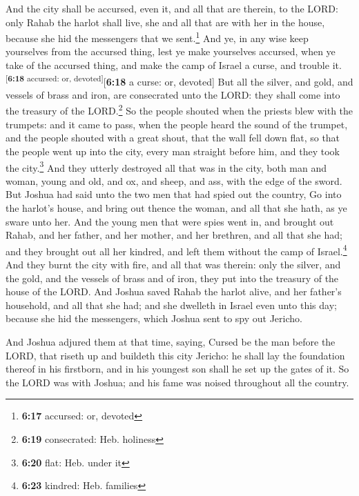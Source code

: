 And the city shall be accursed, even it, and all that
are therein, to the LORD: only Rahab the harlot shall live, she and all
that are with her in the house, because she hid the messengers that we
sent.\footnote{\textbf{6:17} accursed: or, devoted}  And
ye, in any wise keep yourselves from the accursed thing, lest ye make
yourselves accursed, when ye take of the accursed thing, and make the
camp of Israel a curse, and trouble it.\textsuperscript{{[}\textbf{6:18}
accursed: or, devoted{]}}{[}\textbf{6:18} a curse: or, devoted{]}
 But all the silver, and gold, and vessels of brass and
iron, are consecrated unto the LORD: they shall come into the treasury
of the LORD.\footnote{\textbf{6:19} consecrated: Heb. holiness}
 So the people shouted when the priests blew with the
trumpets: and it came to pass, when the people heard the sound of the
trumpet, and the people shouted with a great shout, that the wall fell
down flat, so that the people went up into the city, every man straight
before him, and they took the city.\footnote{\textbf{6:20} flat: Heb.
  under it}  And they utterly destroyed all that was in
the city, both man and woman, young and old, and ox, and sheep, and ass,
with the edge of the sword.  But Joshua had said unto the
two men that had spied out the country, Go into the harlot's house, and
bring out thence the woman, and all that she hath, as ye sware unto her.
 And the young men that were spies went in, and brought
out Rahab, and her father, and her mother, and her brethren, and all
that she had; and they brought out all her kindred, and left them
without the camp of Israel.\footnote{\textbf{6:23} kindred: Heb.
  families}  And they burnt the city with fire, and all
that was therein: only the silver, and the gold, and the vessels of
brass and of iron, they put into the treasury of the house of the LORD.
 And Joshua saved Rahab the harlot alive, and her
father's household, and all that she had; and she dwelleth in Israel
even unto this day; because she hid the messengers, which Joshua sent to
spy out Jericho.

 And Joshua adjured them at that time, saying, Cursed be
the man before the LORD, that riseth up and buildeth this city Jericho:
he shall lay the foundation thereof in his firstborn, and in his
youngest son shall he set up the gates of it.  So the
LORD was with Joshua; and his fame was noised throughout all the
country.

